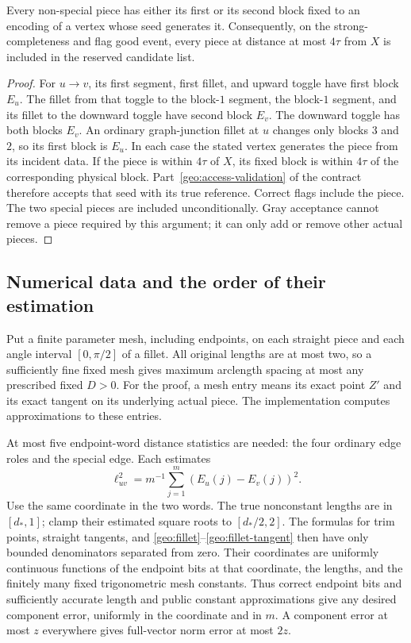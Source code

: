 \begin{lemma}\label{geo:coverage}
Every non-special piece has either its first or its second block fixed
to an encoding of a vertex whose seed generates it. Consequently,
on the strong-completeness and flag good event, every piece at distance
at most $4\tau$ from $X$ is included in the reserved candidate list.
\end{lemma}
\begin{proof}
For $u\to v$, its first segment, first fillet, and upward toggle have
first block $E_u$. The fillet from that toggle to the block-$1$
segment, the block-$1$ segment, and its fillet to the downward toggle
have second block $E_v$. The downward toggle has both blocks $E_v$.
An ordinary graph-junction fillet at $u$ changes only blocks $3$ and
$2$, so its first block is $E_u$. In each case the stated vertex
generates the piece from its incident data. If the piece is within
$4\tau$ of $X$, its fixed block is within $4\tau$ of the corresponding
physical block. Part~\ref{geo:access-validation} of the contract
therefore accepts that seed with its true reference. Correct flags
include the piece. The two special pieces are included unconditionally.
Gray acceptance cannot remove a piece required by this argument; it
can only add or remove other actual pieces.
\end{proof}

\subsection{Numerical data and the order of their estimation}
\label{geo:numerical}

Put a finite parameter mesh, including endpoints, on each straight
piece and each angle interval $[0,\pi/2]$ of a fillet. All original
lengths are at most two, so a sufficiently fine fixed mesh gives
maximum arclength spacing at most any prescribed fixed $D>0$.
For the proof, a mesh entry means its exact point $Z'$ and its exact
tangent on its underlying actual piece. The implementation computes
approximations to these entries.

At most five endpoint-word distance statistics are needed: the four
ordinary edge roles and the special edge. Each estimates
\begin{equation}\label{geo:length-statistic}
 \ell_{uv}^2=m^{-1}\sum_{j=1}^m(E_u(j)-E_v(j))^2.
\end{equation}
Use the same coordinate in the two words. The true nonconstant
lengths are in $[d_*,1]$; clamp their estimated square roots to
$[d_*/2,2]$. The formulas for trim points, straight tangents, and
\eqref{geo:fillet}--\eqref{geo:fillet-tangent} then have only bounded
denominators separated from zero. Their coordinates are uniformly
continuous functions of the endpoint bits at that coordinate, the
lengths, and the finitely many fixed trigonometric mesh constants.
Thus correct endpoint bits and sufficiently accurate length and public
constant approximations give any desired component error, uniformly
in the coordinate and in $m$. A component error at most $z$ everywhere
gives full-vector norm error at most $2z$.

